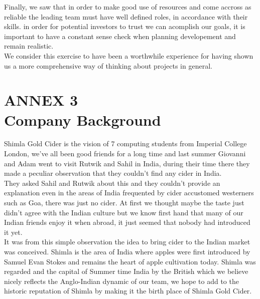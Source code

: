 \documentclass[11pt]{article}
\begin{document}
\noindent Finally, we saw that in order to make good use of resources and come accross as reliable the leading team must have well defined roles, in accordance with their skills. in order for potential investors to trust we can acomplish our goals, it is important to have a constant sense check when planning developement and remain realistic.\\

\noindent We consider this exercise to have been a worthwhile experience for having shown us a more comprehensive way of thinking about projects in general.

\newpage

\section{ANNEX 3 \\ Company Background}
Shimla Gold Cider is the vision of 7 computing students from Imperial College London, we've all been good friends for a long time and last summer Giovanni and Adam went to visit Rutwik and Sahil in India, during their time there they made a peculiar observation that they couldn't find any cider in India. \\

\noindent They asked Sahil and Rutwik about this and they couldn't provide an explanation even in the areas of India frequented by cider accustomed westerners such as Goa, there was just no cider. At first we thought maybe the taste just didn't agree with the Indian culture but we know first hand that many of our Indian friends enjoy it when abroad, it just seemed that nobody had introduced it yet. \\

\noindent It was from this simple observation the idea to bring cider to the Indian market was conceived. Shimla is the area of India where apples were first introduced by Samuel Evan Stokes and remains the heart of apple cultivation today. Shimla was regarded and the capital of Summer time India by the British which we believe nicely reflects the Anglo-Indian dynamic of our team, we hope to add to the historic reputation of Shimla by making it the birth place of Shimla Gold Cider.

\newpage
\end{document}
